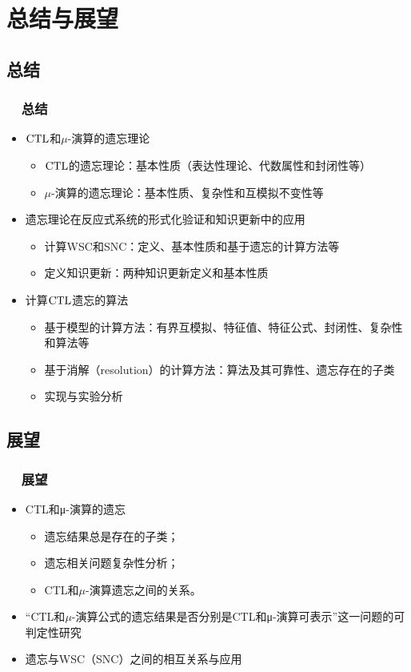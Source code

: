 \documentclass[9pt, CJK]{beamer}
\begin{document}
	
	\section{总结与展望}
	\subsection*{总结}
	\begin{frame}
		\frametitle{~~总结}
		\begin{itemize}[<+-| alert@+>]
			\vskip 8pt
			\item $\textrm{CTL}$和$\mu$-演算的遗忘理论
			\begin{itemize}
				\item $\textrm{CTL}$的遗忘理论：基本性质（表达性理论、代数属性和封闭性等）
				\item $\mu$-演算的遗忘理论：基本性质、复杂性和互模拟不变性等
			\end{itemize}
			\item 遗忘理论在反应式系统的形式化验证和知识更新中的应用
			\begin{itemize}
				\item 计算WSC和SNC：定义、基本性质和基于遗忘的计算方法等
				\item 定义知识更新：两种知识更新定义和基本性质
			\end{itemize}
			\item 计算$\textrm{CTL}$遗忘的算法
			\begin{itemize}
				\item 基于模型的计算方法：有界互模拟、特征值、特征公式、封闭性、复杂性和算法等
				\item 基于消解（resolution）的计算方法：算法及其可靠性、遗忘存在的子类
				\item 实现与实验分析
			\end{itemize}
		\end{itemize}
	\end{frame}
	
	\subsection*{展望}
	\begin{frame}
		\frametitle{~~展望}
		\begin{spacing}{1.5}
			\begin{itemize}
				\item CTL和μ-演算的遗忘
					\begin{itemize}
						\item 遗忘结果总是存在的子类；
						\item 遗忘相关问题复杂性分析；
						\item CTL和$\mu$-演算遗忘之间的关系。
					\end{itemize}
				\item “CTL和$\mu$-演算公式的遗忘结果是否分别是CTL和μ-演算可表示”这一问题的可判定性研究
				\item 遗忘与WSC（SNC）之间的相互关系与应用
			\end{itemize}
		\end{spacing}
	\end{frame}
	
\end{document}
